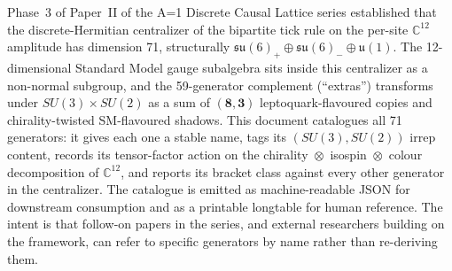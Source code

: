 
Phase~3 of Paper~II of the A=1 Discrete Causal Lattice series
established that the discrete-Hermitian centralizer of the bipartite
tick rule on the per-site $\mathbb{C}^{12}$ amplitude has dimension
71, structurally $\mathfrak{su}(6)_+ \oplus \mathfrak{su}(6)_-
\oplus \mathfrak{u}(1)$.  The 12-dimensional Standard Model gauge
subalgebra sits inside this centralizer as a non-normal subgroup,
and the 59-generator complement (``extras'') transforms under
$SU(3) \times SU(2)$ as a sum of $(\mathbf{8}, \mathbf{3})$
leptoquark-flavoured copies and chirality-twisted SM-flavoured
shadows.  This document catalogues all 71 generators: it gives each
one a stable name, tags its $(SU(3), SU(2))$ irrep content, records
its tensor-factor action on the chirality~$\otimes$~isospin~$\otimes$~colour
decomposition of $\mathbb{C}^{12}$, and reports its bracket class
against every other generator in the centralizer.  The catalogue is
emitted as machine-readable JSON for downstream consumption and as
a printable longtable for human reference.  The intent is that
follow-on papers in the series, and external researchers building
on the framework, can refer to specific generators by name rather
than re-deriving them.
